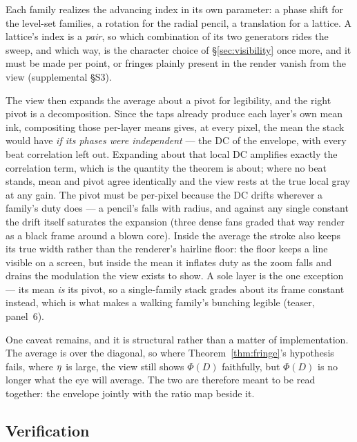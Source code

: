 Each family realizes the advancing index in its own parameter: a phase shift
for the level-set families, a rotation for the radial pencil, a translation for
a lattice. A lattice's index is a \emph{pair}, so which combination of its two
generators rides the sweep, and which way, is the character choice of
\S\ref{sec:visibility} once more, and it must be made per point, or fringes
plainly present in the render vanish from the view (supplemental \S S3).

The view then expands the average about a pivot for legibility, and the
right pivot is a decomposition. Since the taps already produce each layer's
own mean ink, compositing those per-layer means gives, at every pixel, the
mean the stack would have \emph{if its phases were independent} — the DC of
the envelope, with every beat correlation left out. Expanding about that
local DC amplifies exactly the correlation term, which is the quantity the
theorem is about; where no beat stands, mean and pivot agree identically
and the view rests at the true local gray at any gain. The pivot must be
per-pixel because the DC drifts wherever a family's duty does — a pencil's
falls with radius, and against any single constant the drift itself
saturates the expansion (three dense fans graded that way render as a black
frame around a blown core). Inside the average the stroke also keeps its
true width rather than the renderer's hairline floor: the floor keeps a
line visible on a screen, but inside the mean it inflates duty as the zoom
falls and drains the modulation the view exists to show. A sole layer is
the one exception — its mean \emph{is} its pivot, so a single-family stack
grades about its frame constant instead, which is what makes a walking
family's bunching legible (teaser, panel~6).

One caveat remains, and it is structural rather than a matter of implementation.
The average is over the diagonal, so where Theorem~\ref{thm:fringe}'s hypothesis
fails, where $\eta$ is large, the view still shows $\Phi(D)$ faithfully, but
$\Phi(D)$ is no longer what the eye will average. The two are therefore meant to be
read together: the envelope jointly with the ratio map beside it.

\subsection{Verification}

